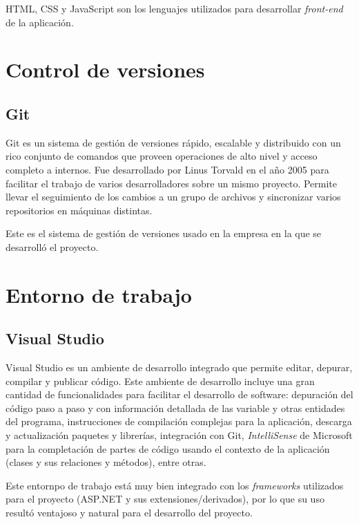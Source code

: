 HTML, CSS y JavaScript son los lenguajes utilizados para desarrollar \textit{front-end} de la aplicación.


\section{Control de versiones}
\subsection{Git}
Git es un sistema de gestión de versiones rápido, escalable y distribuido con un rico conjunto de comandos que proveen operaciones de alto nivel y acceso completo a internos. \cite{gitGit} Fue desarrollado por Linus Torvald en el año 2005 para facilitar el trabajo de varios desarrolladores sobre un mismo proyecto. Permite llevar el seguimiento de los cambios a un grupo de archivos y sincronizar varios repositorios en máquinas distintas.

Este es el sistema de gestión de versiones usado en la empresa en la que se desarrolló el proyecto.

\section{Entorno de trabajo}
\subsection{Visual Studio}
Visual Studio es un ambiente de desarrollo integrado que permite editar, depurar, compilar y publicar código. \cite{visualStudioMicrosoft} Este ambiente de desarrollo incluye una gran cantidad de funcionalidades para facilitar el desarrollo de software: depuración del código paso a paso y con información detallada de las variable y otras entidades del programa, instrucciones de compilación complejas para la aplicación, descarga y actualización paquetes y librerías, integración con Git, \textit{IntelliSense} de Microsoft para la completación de partes de código usando el contexto de la aplicación (clases y sus relaciones y métodos), entre otras.

Este entornpo de trabajo está muy bien integrado con los \textit{frameworks} utilizados para el proyecto (ASP.NET y sus extensiones/derivados), por lo que su uso resultó ventajoso y natural para el desarrollo del proyecto.